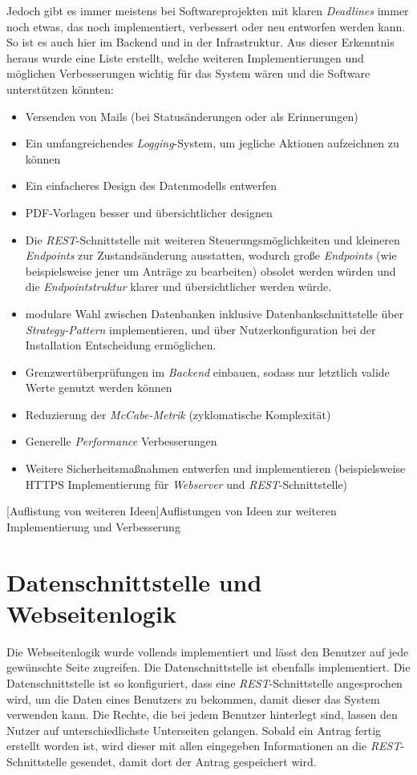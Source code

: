 Jedoch gibt es immer meistens bei Softwareprojekten mit klaren \textit{Deadlines} immer noch etwas, das noch implementiert, verbessert oder neu entworfen werden kann. So ist es auch hier im Backend und in der Infrastruktur. Aus dieser Erkenntnis heraus wurde eine Liste erstellt, welche weiteren Implementierungen und möglichen Verbesserungen wichtig für das System wären und die Software unterstützen könnten:

\begin{itemize}
	\item Versenden von Mails (bei Statusänderungen oder als Erinnerungen)
	\item Ein umfangreichendes \textit{Logging}-System, um jegliche Aktionen aufzeichnen zu können
	\item Ein einfacheres Design des Datenmodells entwerfen
	\item PDF-Vorlagen besser und übersichtlicher designen
	\item Die \textit{REST}-Schnittstelle mit weiteren Steuerungsmöglichkeiten und kleineren \textit{Endpoints} zur Zustandsänderung ausstatten, wodurch große \textit{Endpoints} (wie beispielsweise jener um Anträge zu bearbeiten) obsolet werden würden und die \textit{Endpointstruktur} klarer und übersichtlicher werden würde.
	\item modulare Wahl zwischen Datenbanken inklusive Datenbankschnittstelle über \textit{Strategy-Pattern} implementieren, und über Nutzerkonfiguration bei der Installation Entscheidung ermöglichen.
	\item Grenzwertüberprüfungen im \textit{Backend} einbauen, sodass nur letztlich valide Werte genutzt werden können
	\item Reduzierung der \textit{McCabe-Metrik} (zyklomatische Komplexität)
	\item Generelle \textit{Performance} Verbesserungen
	\item Weitere Sicherheitsmaßnahmen entwerfen und implementieren (beispielsweise HTTPS Implementierung für \textit{Webserver} und \textit{REST}-Schnittstelle)
\end{itemize}
[Auflistung von weiteren Ideen]{Auflistungen von Ideen zur weiteren Implementierung und Verbesserung}
\newpage
\section{Datenschnittstelle und Webseitenlogik}
Die Webseitenlogik wurde vollends implementiert und lässt den Benutzer auf jede gewünschte Seite zugreifen. Die Datenschnittstelle ist ebenfalls implementiert. Die Datenschnittstelle ist so konfiguriert, dass eine \textit{REST}-Schnittstelle angesprochen wird, um die Daten eines Benutzers zu bekommen, damit dieser das System verwenden kann. Die Rechte, die bei jedem Benutzer hinterlegt sind, lassen den Nutzer auf unterschiedlichste Unterseiten gelangen. Sobald ein Antrag fertig erstellt worden ist, wird dieser mit allen eingegeben Informationen an die \textit{REST}-Schnittstelle gesendet, damit dort der Antrag gespeichert wird.\\

